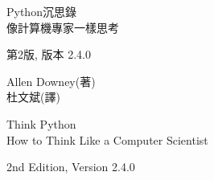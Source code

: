 \documentclass[10pt]{book}
\newcommand{\theversion}{2nd Edition, Version 2.4.0}
\newcommand{\thedate}{}
\begin{document}
\begin{latexonly}

\renewcommand{\blankpage}{\thispagestyle{empty} \quad \newpage}



\thispagestyle{empty}

\begin{flushright}
\vspace*{2.0in}

\begin{spacing}{3}
{\huge Python沉思錄}\\
{\Large 像計算機專家一樣思考}
\end{spacing}

\vspace{0.25in}

{\small 第2版, 版本 2.4.0}

\thedate
\vspace{1in}

{\Large
  Allen Downey(著)\\
}
{\small 杜文斌(譯)}
\vspace{0.5in}

\vfill

\end{flushright}


\blankpage
\blankpage

\pagebreak
\thispagestyle{empty}

\begin{flushright}
\vspace*{2.0in}

\begin{spacing}{3}
{\huge Think Python}\\
{\Large How to Think Like a Computer Scientist}
\end{spacing}

\vspace{0.25in}

\theversion

\thedate


\end{flushright}
\end{latexonly}
\end{document}
